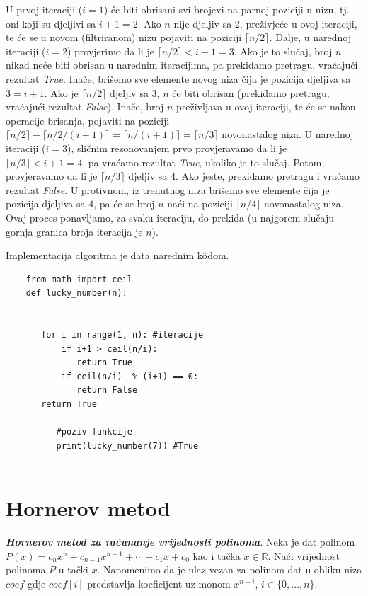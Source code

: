  \begin{solution}
U prvoj iteraciji ($i=1$) će biti obrisani svi brojevi na parnoj poziciji u nizu, tj. oni koji su djeljivi sa $i+1=2$. Ako $n$ nije djeljiv sa $2$, preživjeće u ovoj iteraciji, te će se u novom (filtriranom) nizu pojaviti na poziciji $\lceil n/2 \rceil$. Dalje, u narednoj iteraciji ($i=2$) provjerimo da li je $\lceil n/2 \rceil < i+1=3$. Ako je to slučaj, broj $n$ nikad neće biti obrisan u narednim iteracijima, pa prekidamo pretragu, vraćajući rezultat \emph{True}. Inače, brišemo sve elemente novog niza čija je pozicija djeljiva sa $3=i+1$. Ako je $\lceil n/2 \rceil$ djeljiv sa 3, $n$ će biti obrisan (prekidamo pretragu, vraćajući rezultat \emph{False}). Inače, broj $n$ preživljava u ovoj iteraciji, te će se nakon operacije brisanja, pojaviti na poziciji $\lceil n/2 \rceil - \lceil n/2 /(i+1)\rceil = \lceil n/(i+1) \rceil = \lceil n/3 \rceil$ novonastalog niza. U narednoj iteraciji ($i=3$), sličnim rezonovanjem prvo provjeravamo da li je $\lceil n/3 \rceil < i+1=4$, pa vraćamo rezultat \emph{True}, ukoliko je to slučaj. Potom, provjeravamo da li je
 $\lceil n/3 \rceil$ djeljiv sa 4. Ako jeste, prekidamo pretragu i vraćamo rezultat \emph{False}. U protivnom, iz trenutnog niza brišemo sve elemente čija je pozicija djeljiva sa $4$, pa će se broj $n$ naći na poziciji $\lceil n/4 \rceil$ novonastalog niza. Ovaj proces ponavljamo, za svaku iteraciju, do prekida (u najgorem slučaju gornja granica broja iteracija je $n$).  
 
 
 Implementacija algoritma je data narednim k\^odom. 
 
 \begin{verbatim}
 	from math import ceil
 	def lucky_number(n):
 
 	      
 	   for i in range(1, n): #iteracije
 	       if i+1 > ceil(n/i):
 	          return True 
 	       if ceil(n/i)  % (i+1) == 0:
 	          return False
 	   return True       
    
          #poziv funkcije
          print(lucky_number(7)) #True	       
  
 \end{verbatim}
  
 \end{solution}
 
 \section{Hornerov metod}
\begin{definition}
	\textbf{\textit{Hornerov metod za računanje vrijednosti polinoma}}. Neka je dat polinom $P(x)=c_n x^n + c_{n-1}x^{n-1} + \cdots + c_1 x + c_0$ kao i tačka $x \in \mathbb{R}$. Naći vrijednost polinoma $P$ u tački $x$. Napomenimo da je ulaz vezan za polinom dat u obliku niza $ coef$ gdje   $coef[i]$ predstavlja koeficijent uz monom  $x^{n-i}$, $i \in \{0, \ldots, n\}$. 

\end{definition}

